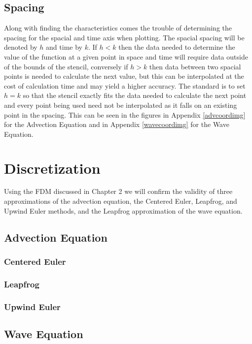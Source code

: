 \subsection{Spacing}
Along with finding the characteristics comes the trouble of determining the spacing for the spacial and time axis when plotting. The spacial spacing will be denoted by $h$ and time by $k$. If $h<k$ then the data needed to determine the value of the function at a given point in space and time will require data outside of the bounds of the stencil, conversely if $h>k$ then data between two spacial points is needed to calculate the next value, but this can be interpolated at the cost of calculation time and may yield a higher accuracy. The standard is to set $h=k$ so that the stencil exactly fits the data needed to calculate the next point and every point being used need not be interpolated as it falls on an existing point in the spacing. This can be seen in the figures in Appendix \ref{advcoordimg} for the Advection Equation and in Appendix \ref{wavecoordimg} for the Wave Equation.
\section{Discretization}
Using the FDM discussed in Chapter 2 we will confirm the validity of three approximations of the advection equation, the Centered Euler, Leapfrog, and Upwind Euler methods, and the Leapfrog approximation of the wave equation.
\subsection{Advection Equation}

\subsubsection{Centered Euler}
\subsubsection{Leapfrog}
\subsubsection{Upwind Euler}
\subsection{Wave Equation}
